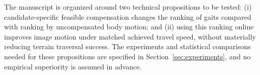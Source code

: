 The manuscript is organized around two technical propositions to be tested: (i) candidate-specific feasible compensation changes the ranking of gaits compared with ranking by uncompensated body motion; and (ii) using this ranking online improves image motion under matched achieved travel speed, without materially reducing terrain traversal success. The experiments and statistical comparisons needed for these propositions are specified in Section~\ref{sec:experiments}, and no empirical superiority is assumed in advance.
